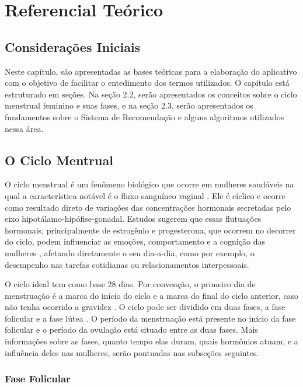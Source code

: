 \chapter[Referencial Teórico]{Referencial Teórico}
\label{ch:referencial}

\section{Considerações Iniciais}

Neste capítulo, são apresentadas as bases teóricas para a elaboração do 
aplicativo com o objetivo de facilitar o entedimento dos termos utilizados. 
O capítulo está estruturado em seções. Na seção 2.2, serão apresentados os 
conceitos sobre o ciclo menstrual feminino e suas fases, e na seção 2.3, serão 
apresentados os fundamentos sobre o Sistema de Recomendação e alguns algoritmos 
utilizados nessa área.

\section{O Ciclo Mentrual}

O ciclo menstrual é um fenômeno biológico que ocorre em mulheres saudáveis
na qual a característica notável é o fluxo sanguíneo vaginal \cite{guyton2012}.
Ele é cíclico e ocorre como resultado direto de variações das concentrações
hormonais secretadas pelo eixo hipotálamo-hipófise-gonadal. Estudos sugerem
que essas flutuações hormonais, principalmente de estrogênio e progesterona,
que ocorrem no decorrer do ciclo, podem influenciar as emoções,
comportamento e a cognição das mulheres \cite{poroma2014}, afetando
diretamente o seu dia-a-dia, como por exemplo, o desempenho nas tarefas
cotidianas ou relacionamentos interpessoais.


O ciclo ideal tem como base 28 dias. Por convenção, o primeiro dia de
menstruação é a marca do início do ciclo e a marca do final do ciclo
anterior, caso não tenha ocorrido a gravidez \cite{lenton1984a}. O ciclo
pode ser dividido em duas fases, a fase folicular e a fase lútea
\cite{brondin2008}. O período da menstruação está presente no início da
fase folicular e o período da ovulação está situado entre as duas fases.
Mais informações sobre as fases, quanto tempo elas duram, quais hormônios
atuam, e a influência deles nas mulheres, serão pontuadas nas subseções
seguintes.


\subsection{Fase Folicular}

